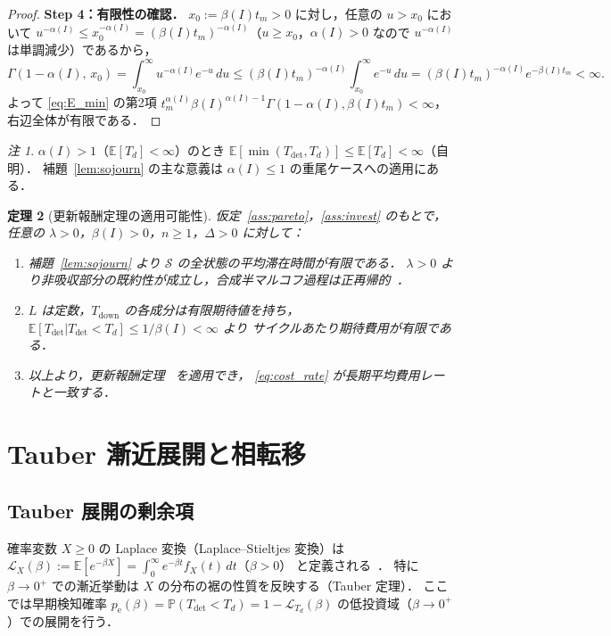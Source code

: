 \documentclass[12pt,a4paper]{article}
\theoremstyle{plain}
\newtheorem{theorem}{定理}[section]
\theoremstyle{definition}
\theoremstyle{remark}
\newtheorem{remark}[theorem]{注}
\newcommand{\E}{\mathbb{E}}
\newcommand{\Prob}{\mathbb{P}}
\newcommand{\calL}{\mathcal{L}}
\newcommand{\pe}{p_{\mathrm{e}}}
\newcommand{\Tdet}{T_{\mathrm{det}}}
\newcommand{\Tdown}{T_{\mathrm{down}}}
\newcommand{\betaI}{\beta(I)}
\newcommand{\alphI}{\alpha(I)}
\begin{document}
\begin{proof}
\textbf{Step 4：有限性の確認．}
$x_0:=\betaI t_m>0$ に対し，任意の $u>x_0$ において
$u^{-\alphI}\le x_0^{-\alphI}=(\betaI t_m)^{-\alphI}$（$u\ge x_0$，$\alphI>0$ なので $u^{-\alphI}$ は単調減少）であるから，
\[
\Gamma(1-\alphI,\,x_0)=\int_{x_0}^\infty u^{-\alphI}e^{-u}\,du
\le(\betaI t_m)^{-\alphI}\int_{x_0}^\infty e^{-u}\,du
=(\betaI t_m)^{-\alphI}e^{-\betaI t_m}<\infty.
\]
よって \eqref{eq:E_min} の第2項 $t_m^{\alphI}\betaI^{\alphI-1}\Gamma(1-\alphI,\betaI t_m)<\infty$，
右辺全体が有限である．
\end{proof}

\begin{remark}
$\alphI>1$（$\E[T_d]<\infty$）のとき $\E[\min(\Tdet,T_d)]\le\E[T_d]<\infty$（自明）．
補題~\ref{lem:sojourn} の主な意義は $\alphI\le1$ の重尾ケースへの適用にある．
\end{remark}

\begin{theorem}[更新報酬定理の適用可能性]\label{thm:renewal}
仮定~\ref{ass:pareto}，\ref{ass:invest} のもとで，任意の $\lambda>0$，$\betaI>0$，$n\ge1$，$\Delta>0$ に対して：
\begin{enumerate}[label=(\roman*)]
\item 補題~\ref{lem:sojourn} より $\mathcal{S}$ の全状態の平均滞在時間が有限である．
  $\lambda>0$ より非吸収部分の既約性が成立し，合成半マルコフ過程は正再帰的~\cite{limnios2001,cinlar1975}．
\item $L$ は定数，$\Tdown$ の各成分は有限期待値を持ち，
  $\E[\Tdet|\Tdet<T_d]\le1/\betaI<\infty$ より
  サイクルあたり期待費用が有限である．
\item 以上より，更新報酬定理~\cite{ross2014,cox1962} を適用でき，
  \eqref{eq:cost_rate} が長期平均費用レートと一致する．
\end{enumerate}
\end{theorem}

\section{Tauber 漸近展開と相転移}
\label{sec:tauberian}

\subsection{Tauber 展開の剰余項}

\begin{tcolorbox}[mathbox, title={Laplace 変換と Tauber 定理}]
確率変数 $X\ge0$ の Laplace 変換（Laplace--Stieltjes 変換）は
$\calL_X(\beta):=\E[e^{-\beta X}]=\int_0^\infty e^{-\beta t}f_X(t)\,dt$（$\beta>0$）
と定義される~\cite{feller1971,bingham1989,asmussen2003}．
特に $\beta\to0^+$ での漸近挙動は $X$ の分布の裾の性質を反映する（Tauber 定理）．
ここでは早期検知確率
$\pe(\beta)=\Prob(\Tdet<T_d)=1-\calL_{T_d}(\beta)$
の低投資域（$\beta\to0^+$）での展開を行う．
\end{tcolorbox}
\end{document}
